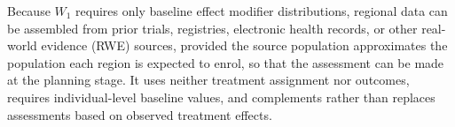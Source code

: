 \documentclass[AMA,Times1COL]{WileyNJDv5}
\begin{document}

Because $W_1$ requires only baseline effect modifier distributions, regional data can be assembled from prior trials, registries, electronic health records, or other real-world evidence (RWE) sources, provided the source population approximates the population each region is expected to enrol, so that the assessment can be made at the planning stage. It uses neither treatment assignment nor outcomes, requires individual-level baseline values, and complements rather than replaces assessments based on observed treatment effects.
\end{document}
